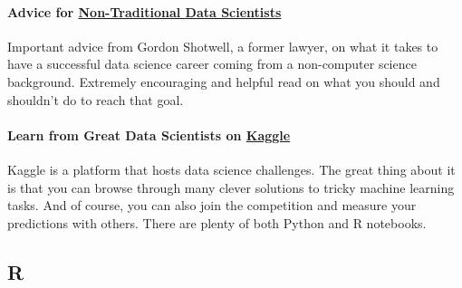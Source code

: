 \documentclass[
  11pt,
]{article}
\begin{document}
\hypertarget{advice-for-non-traditional-data-scientists}{%
\paragraph*{\texorpdfstring{Advice for \href{https://blog.shotwell.ca/posts/learning_data_science/}{Non-Traditional Data Scientists}}{Advice for Non-Traditional Data Scientists}}\label{advice-for-non-traditional-data-scientists}}

Important advice from Gordon Shotwell, a former lawyer, on what it takes to have a successful data science career coming from a non-computer science background. Extremely encouraging and helpful read on what you should and shouldn't do to reach that goal.

\hypertarget{learn-from-great-data-scientists-on-kaggle}{%
\paragraph*{\texorpdfstring{Learn from Great Data Scientists on \href{https://www.kaggle.com/}{Kaggle}}{Learn from Great Data Scientists on Kaggle}}\label{learn-from-great-data-scientists-on-kaggle}}

Kaggle is a platform that hosts data science challenges. The great thing about it is that you can browse through many clever solutions to tricky machine learning tasks. And of course, you can also join the competition and measure your predictions with others. There are plenty of both Python and R notebooks.

\hypertarget{r}{%
\subsection{R}\label{r}}
\end{document}
